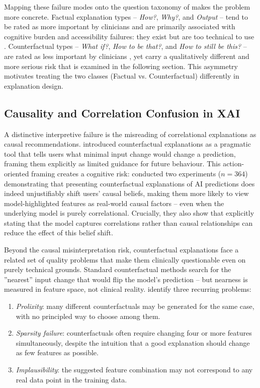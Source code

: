\documentclass[12pt, a4paper]{article}
\begin{document}
Mapping these failure modes onto the question taxonomy of
\citet{liao2020questioning} makes the problem more concrete. Factual
explanation types -- \emph{How?}, \emph{Why?}, and \emph{Output} --
tend to be rated as more important by clinicians and are
primarily associated with cognitive burden and accessibility failures:
they exist but are too technical to use \citep{bienefeld2023solving,
tonekaboni2019clinicians}. Counterfactual types -- \emph{What if?},
\emph{How to be that?}, and \emph{How to still be this?} -- are rated 
as less important by clinicians \citep{liao2020questioning},
yet carry a qualitatively different and more serious risk that is
examined in the following section. This asymmetry motivates treating the 
two classes (Factual vs. Counterfactual) differently
in explanation design.

\subsection{Causality and Correlation Confusion in XAI}
\label{sec:prelim_causal}

A distinctive interpretive failure is the
misreading of correlational explanations as causal recommendations.
\citet{wachter2017counterfactual} introduced counterfactual explanations as
a pragmatic tool that tells users what minimal input change would change a
prediction, framing them explicitly as limited guidance for future behaviour.
This action-oriented framing creates a cognitive risk: \citet{tesic2022counterfactual}
conducted two experiments ($n = 364$) demonstrating that presenting counterfactual
explanations of AI predictions does indeed unjustifiably shift users' causal
beliefs, making them more likely to view model-highlighted features as real-world
causal factors -- even when the underlying model is purely correlational. Crucially,
they also show that explicitly stating that the model captures correlations rather
than causal relationships can reduce the effect of this belief shift.

Beyond the causal misinterpretation risk, counterfactual explanations face
a related set of quality problems that make them clinically questionable
even on purely technical grounds. Standard counterfactual methods search
for the ''nearest'' input change that would flip the model's prediction
-- but nearness is measured in feature space, not clinical reality.
\citet{keane2020good} identify three recurring problems:
\begin{enumerate}
  \item \emph{Prolixity}: many different counterfactuals may be generated
    for the same case, with no principled way to choose among them.
  \item \emph{Sparsity failure}: counterfactuals often require changing
    four or more features simultaneously, despite the intuition that a
    good explanation should change as few features as possible.
  \item \emph{Implausibility}: the suggested feature combination may not
    correspond to any real data point in the training data.
\end{enumerate}
\end{document}

